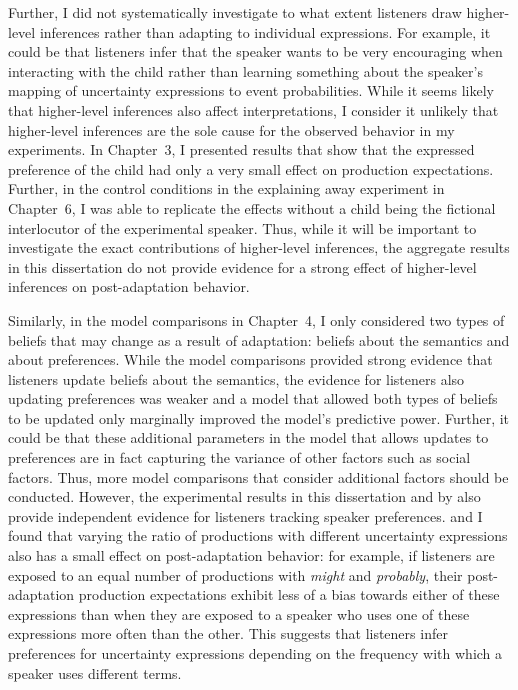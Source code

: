 Further, I did not systematically investigate to what extent listeners draw higher-level inferences rather than adapting to individual expressions. For example, it 
could be that listeners infer that the speaker wants to be very encouraging when interacting with the child rather than learning something about the speaker's mapping of
uncertainty expressions to event probabilities. While it seems likely that higher-level inferences also affect interpretations, I consider it unlikely that higher-level inferences are the
sole cause for the observed behavior in my experiments. In Chapter~3, I presented results that show that the expressed preference of the child had only a very small effect on
production expectations. Further, in the control conditions in  the explaining away experiment in Chapter~6, I was able to replicate the effects without a child being the fictional
 interlocutor of the experimental speaker. Thus, while it will be important to investigate the exact contributions of higher-level inferences, the aggregate results in 
 this dissertation do not provide evidence for a strong effect of higher-level inferences on post-adaptation behavior.

Similarly, in the model comparisons in Chapter~4, I only considered two types of beliefs that may change as a result of adaptation: beliefs about the semantics
and about preferences. While the model comparisons provided strong evidence that listeners update beliefs about the semantics, the evidence for listeners also updating
preferences was weaker and a model that allowed both types of beliefs to be updated only marginally improved the model's predictive power. 
Further, it could be that these additional parameters in the model that allows updates to preferences are in fact capturing the variance of other factors such as social factors. 
Thus, more model comparisons that consider additional factors should be conducted. However, the experimental results in this dissertation and by \textcite{Yildirim2016}
also provide independent evidence for listeners tracking speaker preferences. \textcite{Yildirim2016} and I found that varying the ratio of productions with different uncertainty expressions also has a small effect on post-adaptation behavior: 
for example, if listeners are exposed to an equal number of productions with \textit{might} and \textit{probably}, their post-adaptation production expectations exhibit less of a bias towards either
of these expressions than when they are exposed to a speaker who uses one of these expressions more often than the other.  This suggests that listeners infer preferences for uncertainty expressions depending on the frequency with which a speaker uses different terms.

